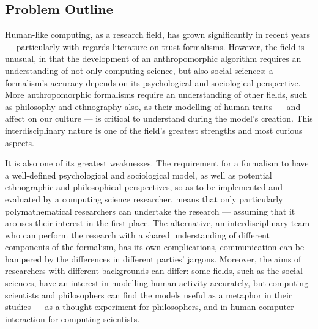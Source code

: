 \subsection{Problem Outline}\label{sec:problem_outline}




Human-like computing, as a research field, has grown significantly in recent years --- particularly with regards literature on trust formalisms. However, the field is unusual, in that the development of an anthropomorphic algorithm requires an understanding of not only computing science, but also social sciences: a formalism's accuracy depends on its psychological and sociological perspective. More anthropomorphic formalisms require an understanding of other fields, such as philosophy and ethnography also, as their modelling of human traits --- and affect on our culture --- is critical to understand during the model's creation. This interdisciplinary nature is one of the field's greatest strengths and most curious aspects.\par

It is also one of its greatest weaknesses. The requirement for a formalism to have a well-defined psychological and sociological model, as well as potential ethnographic and philosophical perspectives, so as to be implemented and evaluated by a computing science researcher, means that only particularly polymathematical researchers can undertake the research --- assuming that it arouses their interest in the first place. The alternative, an interdisciplinary team who can perform the research with a shared understanding of different components of the formalism, has its own complications, communication can be hampered by the differences in different parties' jargons. Moreover, the aims of researchers with different backgrounds can differ: some fields, such as the social sciences, have an interest in modelling human activity accurately, but computing scientists and philosophers can find the models useful as a metaphor in their studies --- as a thought experiment for philosophers, and in human-computer interaction for computing scientists.\par

